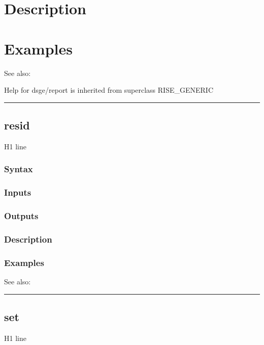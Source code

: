 \documentclass[letterpaper,10pt,english]{sphinxmanual}
\begin{document}
\section{Description}
\label{classes/models/@dsge/dsge:id143}

\section{Examples}
\label{classes/models/@dsge/dsge:id144}
See also:

Help for dsge/report is inherited from superclass RISE\_GENERIC


\bigskip\hrule{}\bigskip



\subsection{resid}
\label{classes/models/@dsge/dsge:id145}\label{classes/models/@dsge/dsge:resid}
H1 line


\subsubsection{Syntax}
\label{classes/models/@dsge/dsge:id146}

\subsubsection{Inputs}
\label{classes/models/@dsge/dsge:id147}

\subsubsection{Outputs}
\label{classes/models/@dsge/dsge:id148}

\subsubsection{Description}
\label{classes/models/@dsge/dsge:id149}

\subsubsection{Examples}
\label{classes/models/@dsge/dsge:id150}
See also:


\bigskip\hrule{}\bigskip



\subsection{set}
\label{classes/models/@dsge/dsge:set}\label{classes/models/@dsge/dsge:id151}
H1 line
\end{document}
